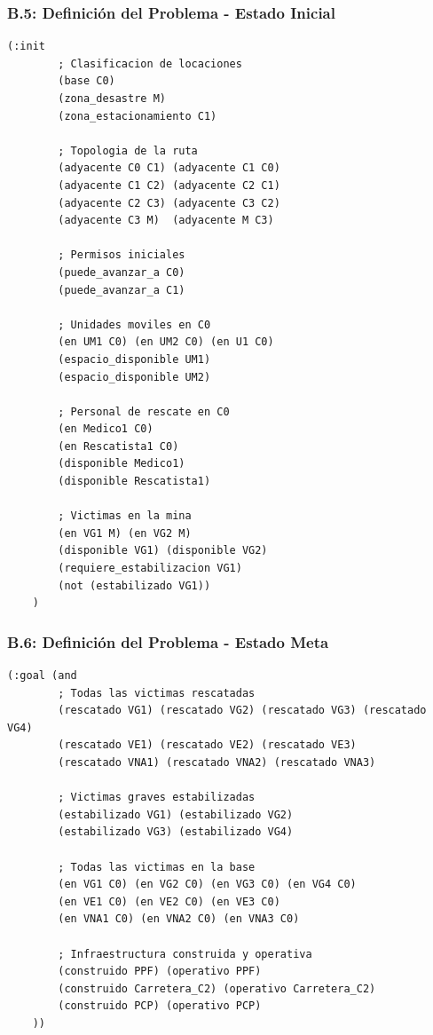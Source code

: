 \documentclass[conference]{IEEEtran}
\begin{document}
    \subsubsection*{B.5: Definición del Problema - Estado Inicial}

    \begin{lstlisting}[style=anexostyle,caption={Ejemplo del estado inicial del problema}]
    (:init
        ; Clasificacion de locaciones
        (base C0)
        (zona_desastre M)
        (zona_estacionamiento C1)
        
        ; Topologia de la ruta
        (adyacente C0 C1) (adyacente C1 C0)
        (adyacente C1 C2) (adyacente C2 C1)
        (adyacente C2 C3) (adyacente C3 C2)
        (adyacente C3 M)  (adyacente M C3)
        
        ; Permisos iniciales
        (puede_avanzar_a C0)
        (puede_avanzar_a C1)
        
        ; Unidades moviles en C0
        (en UM1 C0) (en UM2 C0) (en U1 C0)
        (espacio_disponible UM1)
        (espacio_disponible UM2)
        
        ; Personal de rescate en C0
        (en Medico1 C0)
        (en Rescatista1 C0)
        (disponible Medico1)
        (disponible Rescatista1)
        
        ; Victimas en la mina
        (en VG1 M) (en VG2 M)
        (disponible VG1) (disponible VG2)
        (requiere_estabilizacion VG1)
        (not (estabilizado VG1))
    )
    \end{lstlisting}

    \subsubsection*{B.6: Definición del Problema - Estado Meta}

    \begin{lstlisting}[style=anexostyle,caption={Condiciones de éxito del problema}]
    (:goal (and
        ; Todas las victimas rescatadas
        (rescatado VG1) (rescatado VG2) (rescatado VG3) (rescatado VG4)
        (rescatado VE1) (rescatado VE2) (rescatado VE3)
        (rescatado VNA1) (rescatado VNA2) (rescatado VNA3)
        
        ; Victimas graves estabilizadas
        (estabilizado VG1) (estabilizado VG2)
        (estabilizado VG3) (estabilizado VG4)
        
        ; Todas las victimas en la base
        (en VG1 C0) (en VG2 C0) (en VG3 C0) (en VG4 C0)
        (en VE1 C0) (en VE2 C0) (en VE3 C0)
        (en VNA1 C0) (en VNA2 C0) (en VNA3 C0)
        
        ; Infraestructura construida y operativa
        (construido PPF) (operativo PPF)
        (construido Carretera_C2) (operativo Carretera_C2)
        (construido PCP) (operativo PCP)
    ))
    \end{lstlisting}
\end{document}
